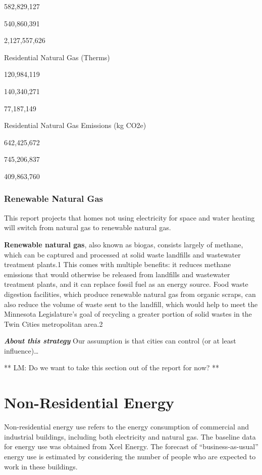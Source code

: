 \documentclass[
]{book}
\begin{document}
582,829,127

540,860,391

2,127,557,626

Residential Natural Gas (Therms)

120,984,119

140,340,271

77,187,149

Residential Natural Gas Emissions (kg CO2e)

642,425,672

745,206,837

409,863,760

\hypertarget{renewable-natural-gas}{%
\subsubsection{Renewable Natural Gas}\label{renewable-natural-gas}}

This report projects that homes not using electricity for space and water heating will switch from natural gas to renewable natural gas.

\textbf{Renewable natural gas}, also known as biogas, consists largely of methane, which can be captured and processed at solid waste landfills and wastewater treatment plants.1 This comes with multiple benefits: it reduces methane emissions that would otherwise be released from landfills and wastewater treatment plants, and it can replace fossil fuel as an energy source. Food waste digestion facilities, which produce renewable natural gas from organic scraps, can also reduce the volume of waste sent to the landfill, which would help to meet the Minnesota Legislature's goal of recycling a greater portion of solid wastes in the Twin Cities metropolitan area.2

\textbf{\emph{About this strategy}} Our assumption is that cities can control (or at least influence)\ldots{}

** LM: Do we want to take this section out of the report for now? **

\hypertarget{non-residential-energy}{%
\section{Non-Residential Energy}\label{non-residential-energy}}

Non-residential energy use refers to the energy consumption of commercial and industrial buildings, including both electricity and natural gas. The baseline data for energy use was obtained from Xcel Energy. The forecast of ``business-as-usual'' energy use is estimated by considering the number of people who are expected to work in these buildings.
\end{document}
